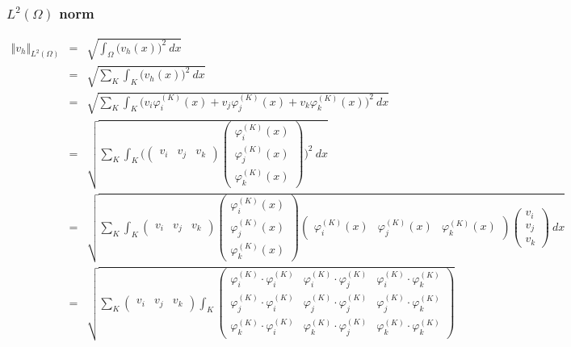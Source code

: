 \documentclass[a4paper,10pt]{article}
\begin{document}
\subsubsection{$ L^2(\Omega) $ norm}
\begin{eqnarray}\nonumber
\Vert v_{h} \Vert_{L^2(\Omega)} &=& \sqrt{\int_{\Omega} \big(v_{h}(x)\big)^2 \ dx} \\ \nonumber
&=& \sqrt{ \sum_{K} \int_{K} \big(v_{h}(x)\big)^2 \ dx} \\ \nonumber
&=& \sqrt{ \sum_{K} \int_{K} \big( v_{i}\varphi_{i}^{(K)}(x) + v_{j}\varphi_{j}^{(K)}(x) + v_{k}\varphi_{k}^{(K)}(x) \big)^2 \ dx} \\ \nonumber
&=& \sqrt{ \sum_{K} \int_{K} \Big(
	\begin{pmatrix}
	v_{i} & v_{j} & v_{k}
	\end{pmatrix}
	\begin{pmatrix}
	\varphi_{i}^{(K)}(x) \\ \varphi_{j}^{(K)}(x) \\ \varphi_{k}^{(K)}(x) 
	\end{pmatrix}
	\Big)^2 \ dx} \\\ \nonumber
&=& \sqrt{ \sum_{K} \int_{K}
	\begin{pmatrix}
	v_{i} & v_{j} & v_{k}
	\end{pmatrix}
	\begin{pmatrix}
	\varphi_{i}^{(K)}(x) \\ \varphi_{j}^{(K)}(x) \\ \varphi_{k}^{(K)}(x) 
	\end{pmatrix}
	\begin{pmatrix}
	\varphi_{i}^{(K)}(x) & \varphi_{j}^{(K)}(x) & \varphi_{k}^{(K)}(x) 
	\end{pmatrix}
	\begin{pmatrix}
	v_{i} \\ v_{j} \\ v_{k}
	\end{pmatrix} \ dx} \\ \nonumber
&=& \sqrt{ \sum_{K}
	\begin{pmatrix}
	v_{i} & v_{j} & v_{k}
	\end{pmatrix}
	\int_{K}
	\begin{pmatrix}
	\varphi_{i}^{(K)}\cdot\varphi_{i}^{(K)} & \varphi_{i}^{(K)}\cdot\varphi_{j}^{(K)} & \varphi_{i}^{(K)}\cdot\varphi_{k}^{(K)} \\ \varphi_{j}^{(K)}\cdot\varphi_{i}^{(K)} & \varphi_{j}^{(K)}\cdot\varphi_{j}^{(K)} & \varphi_{j}^{(K)}\cdot\varphi_{k}^{(K)}  \\ \varphi_{k}^{(K)}\cdot\varphi_{i}^{(K)} & \varphi_{k}^{(K)}\cdot\varphi_{j}^{(K)} & \varphi_{k}^{(K)}\cdot\varphi_{k}^{(K)} 

\end{pmatrix}}
\end{eqnarray}
\end{document}
